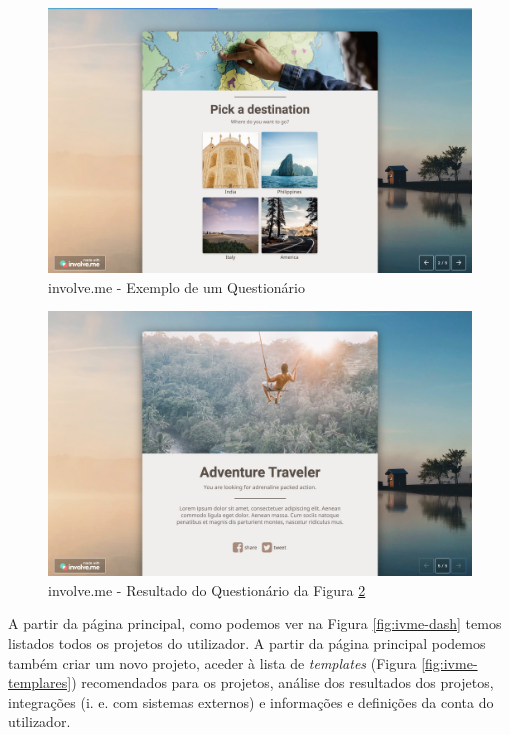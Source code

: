 \begin{figure}[ht!]
	\begin{center}
		\includegraphics[width=1\textwidth]{img/ivme/x1}
		\caption{involve.me - Exemplo de um Questionário}
		\label{fig:ivme-x1}
	\end{center}
\end{figure}

\begin{figure}[ht!]
	\begin{center}
		\includegraphics[width=1\textwidth]{img/ivme/x2}
		\caption{involve.me - Resultado do Questionário da Figura \ref{fig:ivme-x2}}
		\label{fig:ivme-x2}
	\end{center}
\end{figure}

\pagebreak

A partir da página principal, como podemos ver na Figura \ref{fig:ivme-dash} temos listados todos os projetos do utilizador. A partir da página principal podemos também criar um novo projeto, aceder à lista de \textit{templates} (Figura \ref{fig:ivme-templares}) recomendados para os projetos, análise dos resultados dos projetos, integrações (i. e. com sistemas externos) e informações e definições da conta do utilizador. 

